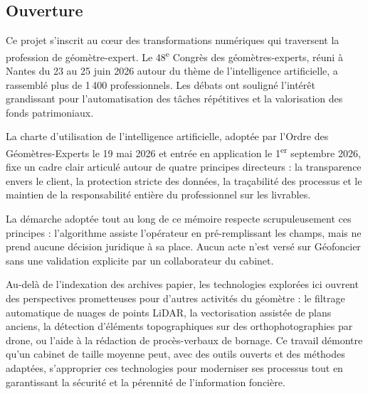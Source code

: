 \subsection{Ouverture}

Ce projet s'inscrit au cœur des transformations numériques qui traversent la profession de géomètre-expert. Le 48\textsuperscript{e} Congrès des géomètres-experts, réuni à Nantes du 23 au 25 juin 2026 autour du thème de l'intelligence artificielle, a rassemblé plus de 1\,400 professionnels. Les débats ont souligné l'intérêt grandissant pour l'automatisation des tâches répétitives et la valorisation des fonds patrimoniaux.

La charte d'utilisation de l'intelligence artificielle, adoptée par l'Ordre des Géomètres-Experts le 19 mai 2026 et entrée en application le 1\textsuperscript{er} septembre 2026, fixe un cadre clair articulé autour de quatre principes directeurs : la transparence envers le client, la protection stricte des données, la traçabilité des processus et le maintien de la responsabilité entière du professionnel sur les livrables.

La démarche adoptée tout au long de ce mémoire respecte scrupuleusement ces principes : l'algorithme assiste l'opérateur en pré-remplissant les champs, mais ne prend aucune décision juridique à sa place. Aucun acte n'est versé sur Géofoncier sans une validation explicite par un collaborateur du cabinet.

Au-delà de l'indexation des archives papier, les technologies explorées ici ouvrent des perspectives prometteuses pour d'autres activités du géomètre : le filtrage automatique de nuages de points LiDAR, la vectorisation assistée de plans anciens, la détection d'éléments topographiques sur des orthophotographies par drone, ou l'aide à la rédaction de procès-verbaux de bornage. Ce travail démontre qu'un cabinet de taille moyenne peut, avec des outils ouverts et des méthodes adaptées, s'approprier ces technologies pour moderniser ses processus tout en garantissant la sécurité et la pérennité de l'information foncière.



